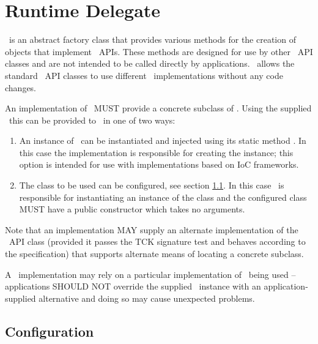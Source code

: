\chapter{Runtime Delegate}
\label{runtimedelegate}

\rd\ is an abstract factory class that provides various methods for the creation of objects that implement \jaxrs\ APIs. These methods are designed for use by other \jaxrs\ API classes and are not intended to be called directly by applications. \rd\ allows the standard \jaxrs\ API classes to use different \jaxrs\ implementations without any code changes.

An implementation of \jaxrs\ MUST provide a concrete subclass of \rd. Using the supplied \rd\ this can be provided to \jaxrs\ in one of two ways:

\begin{enumerate}
\item An instance of \rd\ can be instantiated and injected using its static method . In this case the implementation is responsible for creating the instance; this option is intended for use with implementations based on IoC frameworks.
\item The class to be used can be configured, see section \ref{rdconfig}. In this case \jaxrs\ is responsible for instantiating an instance of the class and the configured class MUST have a public constructor which takes no arguments.
\end{enumerate}

Note that an implementation MAY supply an alternate implementation of the \rd\ API class (provided it passes the TCK signature test and behaves according to the specification) that supports alternate means of locating a concrete subclass.

A \jaxrs\ implementation may rely on a particular implementation of \rd\ being used -- applications SHOULD NOT override the supplied \rd\ instance with an application-supplied alternative and doing so may cause unexpected problems. 

\section{Configuration}\label{rdconfig}

